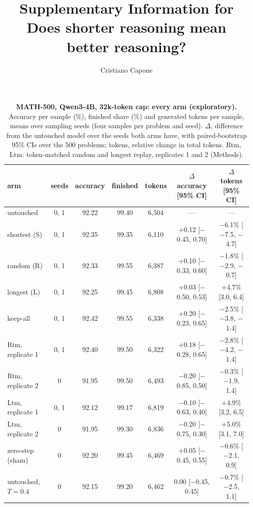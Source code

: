 \documentclass[10pt]{article}
\title{\sffamily\bfseries\Large Supplementary Information for\\[3pt] Does shorter reasoning mean better reasoning?}
\author{\normalfont Cristiano Capone}
\date{}
\begin{document}
\maketitle




\renewcommand{\theHfigure}{S\arabic{figure}}
\renewcommand{\theHtable}{S\arabic{table}}

\begin{table}[h]
\centering\small
\caption{\textbf{MATH-500, Qwen3-4B, 32k-token cap: every arm (exploratory).} Accuracy per sample (\%), finished share (\%) and generated tokens per sample, means over sampling seeds (four samples per problem and seed). $\Delta$, difference from the untouched model over the seeds both arms have, with paired-bootstrap 95\% CIs over the 500 problems; tokens, relative change in total tokens. Rtm, Ltm: token-matched random and longest replay, replicates 1 and 2 (Methods).}
\label{tab:s32k}
\setlength{\tabcolsep}{4pt}
\begin{tabular}{lcccccc}
\toprule
arm & seeds & accuracy & finished & tokens & $\Delta$ accuracy [95\% CI] & $\Delta$ tokens [95\% CI] \\
\midrule
untouched & 0, 1 & 92.22 & 99.40 & 6{,}504 & --- & --- \\
shortest (S) & 0, 1 & 92.35 & 99.35 & 6{,}110 & $+$0.12 [$-$0.45, 0.70] & $-$6.1\% [$-$7.5, $-$4.7] \\
random (R) & 0, 1 & 92.33 & 99.55 & 6{,}387 & $+$0.10 [$-$0.33, 0.60] & $-$1.8\% [$-$2.9, $-$0.7] \\
longest (L) & 0, 1 & 92.25 & 99.45 & 6{,}808 & $+$0.03 [$-$0.50, 0.53] & $+$4.7\% [3.0, 6.4] \\
keep-all & 0, 1 & 92.42 & 99.55 & 6{,}338 & $+$0.20 [$-$0.23, 0.65] & $-$2.5\% [$-$3.8, $-$1.4] \\
Rtm, replicate 1 & 0, 1 & 92.40 & 99.50 & 6{,}322 & $+$0.18 [$-$0.28, 0.65] & $-$2.8\% [$-$4.2, $-$1.4] \\
Rtm, replicate 2 & 0 & 91.95 & 99.50 & 6{,}493 & $-$0.20 [$-$0.85, 0.50] & $-$0.3\% [$-$1.9, 1.4] \\
Ltm, replicate 1 & 0, 1 & 92.12 & 99.17 & 6{,}819 & $-$0.10 [$-$0.63, 0.40] & $+$4.9\% [3.2, 6.5] \\
Ltm, replicate 2 & 0 & 91.95 & 99.30 & 6{,}836 & $-$0.20 [$-$0.75, 0.30] & $+$5.0\% [3.1, 7.0] \\
zero-step (sham) & 0 & 92.20 & 99.45 & 6{,}469 & $+$0.05 [$-$0.45, 0.55] & $-$0.6\% [$-$2.1, 0.9] \\
untouched, $T=0.4$ & 0 & 92.15 & 99.20 & 6{,}462 & 0.00 [$-$0.45, 0.45] & $-$0.7\% [$-$2.5, 1.1] \\
\bottomrule
\end{tabular}
\end{table}
\end{document}
